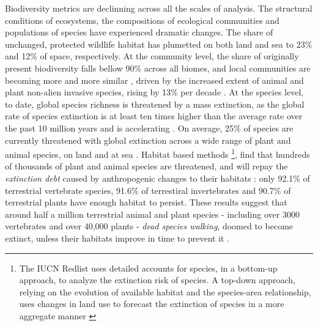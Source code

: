 Biodiversity metrics are declinning across all the scales of analysis. The structural conditions of ecosystems, the compositions of ecological communities and populations of species have experienced dramatic changes. The share of unchanged, protected wildlife habitat has plumetted on both land and sea \citep{watson_2016_catastrophic, jones_2018_location} to 23\% and 12\% of space, respectively. At the community level, the share of originally present biodiversity falls bellow 90\% across all biomes, \citep{Hill311787} and local communities are becoming more and more similar \citep{mckinney_1999_biotic}, driven by the increased extent of animal and plant non-alien invasive species, rising by 13\% per decade \citep{seebens_no_2017}. At the species level, to date, global species richness is threatened by a mass extinction, as the global rate of species extinction is at least ten times higher than the average rate over the past 10 million years and is accelerating \citep{barnosky_has_2011, ceballos_accelerated_2015}. On average, 25\% of species are currently threatened with global extinction across a wide range of plant and animal species, on land and at sea \citep{IUCN_redlist_2024}.  Habitat based methods \footnote{ The IUCN Redlist uses detailed accounts for species, in a bottom-up approach, to analyze the extinction risk of species. A top-down approach, relying on the evolution of available habitat and the species-area relationship, uses changes in land use to forecast the extinction of species in a more aggregate manner \citep{Diamond1972BiogeographicKE}}, \cite{Hoskins309377} find that hundreds of thousands of plant and animal species are threatened, and will repay the \textit{extinction debt} caused by anthropogenic changes to their habitats : only 92.1\% of terrestrial vertebrate species, 91.6\% of terrestiral invertebrates and 90.7\% of terrestrial plants have enough habitat to persist. These results suggest that around half a million terrestrial animal and plant species - including over 3000 vertebrates and over 40,000 plants - \textit{dead species walking}, doomed to become extinct, unless their habitats improve in time to prevent it \citep{ipbes_2022_6417333}.


